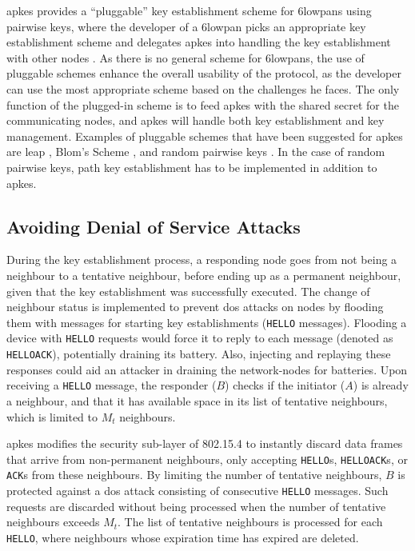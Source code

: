 \gls{apkes} provides a ``pluggable'' key establishment scheme for \gls{6lowpan}s using pairwise keys, where the developer of a \gls{6lowpan} picks an appropriate key establishment scheme and delegates \gls{apkes} into handling the key establishment with other nodes \cite{krentz20136lowpan}. As there is no general scheme for \gls{6lowpan}s, the use of pluggable schemes enhance the overall usability of the protocol, as the developer can use the most appropriate scheme based on the challenges he faces. The only function of the plugged-in scheme is to feed \gls{apkes} with the shared secret for the communicating nodes, and \gls{apkes} will handle both key establishment and key management. Examples of pluggable schemes that have been suggested for \gls{apkes} are \gls{leap} \cite{zhu2006leap+}, Blom's Scheme \cite{blom1984optimal}, and random pairwise keys \cite{chan2003random}. In the case of random pairwise keys, path key establishment has to be implemented in addition to \gls{apkes}.

\subsection{Avoiding Denial of Service Attacks}

During the key establishment process, a responding node goes from not being a neighbour to a tentative neighbour, before ending up as a permanent neighbour, given that the key establishment was successfully executed. The change of neighbour status is implemented to prevent \gls{dos} attacks on nodes by flooding them with messages for starting key establishments (\texttt{HELLO} messages). Flooding a device with \texttt{HELLO} requests would force it to reply to each message (denoted as \texttt{HELLOACK}), potentially draining its battery. Also, injecting and replaying these responses could aid an attacker in draining the network-nodes for batteries. Upon receiving a \texttt{HELLO} message, the responder ($B$) checks if the initiator ($A$) is already a neighbour, and that it has available space in its list of tentative neighbours, which is limited to $M_t$ neighbours. 

\gls{apkes} modifies the security sub-layer of 802.15.4 to instantly discard data frames that arrive from non-permanent neighbours, only accepting \texttt{HELLO}s, \texttt{HELLOACK}s, or \texttt{ACK}s from these neighbours. By limiting the number of tentative neighbours, $B$ is protected against a \gls{dos} attack consisting of consecutive \texttt{HELLO} messages. Such requests are discarded without being processed when the number of tentative neighbours exceeds $M_t$. The list of tentative neighbours is processed for each \texttt{HELLO}, where neighbours whose expiration time has expired are deleted.

